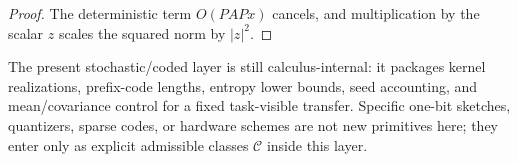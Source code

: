 \begin{proof}
The deterministic term \(O(PAPx)\) cancels, and multiplication by the scalar
\(z\) scales the squared norm by \(|z|^2\).
\end{proof}

\begin{remark}
\label{rem:coded-closure-boundary}
The present stochastic/coded layer is still calculus-internal: it packages
kernel realizations, prefix-code lengths, entropy lower bounds, seed
accounting, and mean/covariance control for a fixed task-visible transfer.
Specific one-bit sketches, quantizers, sparse codes, or hardware schemes are
not new primitives here; they enter only as explicit admissible classes
\(\mathcal C\) inside this layer.
\end{remark}
